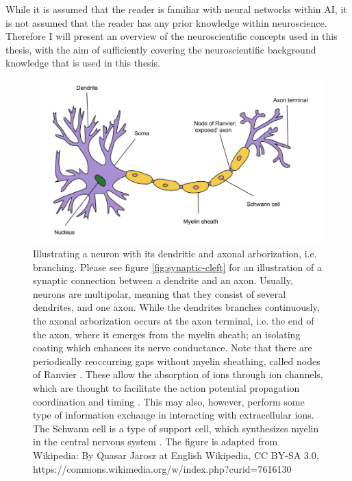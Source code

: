While it is assumed that the reader is familiar with neural networks within AI, it is not assumed that the reader has any prior knowledge within neuroscience. Therefore I will present an overview of the neuroscientific concepts used in this thesis, with the aim of sufficiently covering the neuroscientific background knowledge that is used in this thesis.
\\

\begin{figure}
    \centering
    \includegraphics[width=12cm]{fig/neuron-figure-wikipedia}
    \caption{Illustrating a neuron with its dendritic and axonal arborization, i.e. branching. Please see figure \ref{fig:synaptic-cleft} for an illustration of a synaptic connection between a dendrite and an axon. Usually, neurons are multipolar, meaning that they consist of several dendrites, and one axon. While the dendrites branches continuously, the axonal arborization occurs at the axon terminal, i.e. the end of the axon, where it emerges from the myelin sheath; an isolating coating which enhances its nerve conductance. Note that there are periodically reoccurring gaps without myelin sheathing, called nodes of Ranvier \citep{Byrne2014chpt1p11}. These allow the absorption of ions through ion channels, which are thought to facilitate the action potential propagation coordination and timing \citep{Byrne2014chpt2p26}. This may also, however, perform some type of information exchange in interacting with extracellular ions. The Schwann cell is a type of support cell, which synthesizes myelin in the central nervous system \citep{Byrne2014chpt1p11}.
    The figure is adapted from Wikipedia: By Quasar Jarosz at English Wikipedia, CC BY-SA 3.0, https://commons.wikimedia.org/w/index.php?curid=7616130}
    \label{fig:neurons-synapses}
\end{figure}

